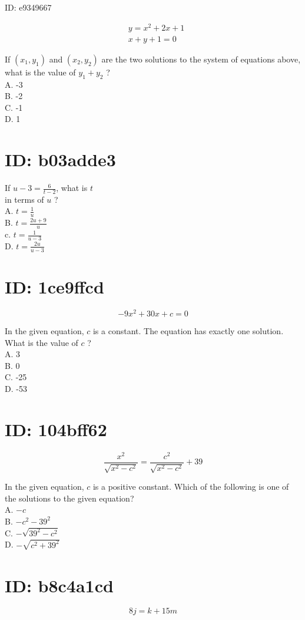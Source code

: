 ID: e9349667

$$
\begin{aligned}
& y=x^{2}+2 x+1 \\
& x+y+1=0
\end{aligned}
$$

If $\left(x_{1}, y_{1}\right)$ and $\left(x_{2}, y_{2}\right)$ are the two solutions to the system of equations above, what is the value of $y_{1}+y_{2}$ ?\\
A. -3\\
B. -2\\
C. -1\\
D. 1

\section*{ID: b03adde3}
If $u-3=\frac{6}{t-2}$, what is $t$\\
in terms of $u$ ?\\
A. $t=\frac{1}{u}$\\
B. $t=\frac{2 u+9}{u}$\\
c. $t=\frac{1}{u-3}$\\
D. $t=\frac{2 u}{u-3}$

\section*{ID: 1ce9ffcd}
$$
-9 x^{2}+30 x+c=0
$$

In the given equation, $c$ is a constant. The equation has exactly one solution. What is the value of $c$ ?\\
A. 3\\
B. 0\\
C. -25\\
D. -53

\section*{ID: 104bff62}
$$
\frac{x^{2}}{\sqrt{x^{2}-c^{2}}}=\frac{c^{2}}{\sqrt{x^{2}-c^{2}}}+39
$$

In the given equation, $c$ is a positive constant. Which of the following is one of the solutions to the given equation?\\
A. $-c$\\
B. $-c^{2}-39^{2}$\\
C. $-\sqrt{39^{2}-c^{2}}$\\
D. $-\sqrt{c^{2}+39^{2}}$

\section*{ID: b8c4a1cd}
$$
8 j=k+15 m
$$

